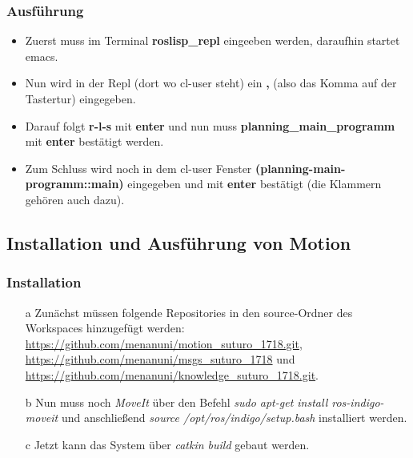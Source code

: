 \documentclass{suturo}
\begin{document}
\subsubsection{Ausführung}
\begin{itemize}

\item Zuerst muss im Terminal \textbf{roslisp\_repl} eingeeben werden, daraufhin startet emacs. 

\item Nun wird in der Repl (dort wo cl-user steht) ein \textbf{,} (also das Komma auf der Tastertur) eingegeben.

\item Darauf folgt \textbf{r-l-s} mit \textbf{enter} und nun muss \textbf{planning\_main\_programm} mit \textbf{enter} bestätigt werden.

\item Zum Schluss wird noch in dem cl-user Fenster \textbf{(planning-main-programm::main)} eingegeben und mit \textbf{enter} bestätigt (die Klammern gehören auch dazu).
\end{itemize}


\subsection{Installation und Ausführung von Motion}

\subsubsection{Installation}
\begin{itemize}


\item[a] Zunächst müssen folgende Repositories in den source-Ordner des Workspaces hinzugefügt werden: \url{https://github.com/menanuni/motion_suturo_1718.git}, \url{https://github.com/menanuni/msgs_suturo_1718} und \url{https://github.com/menanuni/knowledge_suturo_1718.git}.

\item[b] Nun muss noch \textit{MoveIt} über den Befehl \textit{sudo apt-get install ros-indigo-moveit} und anschließend \textit{source /opt/ros/indigo/setup.bash} installiert werden.

\item[c] Jetzt kann das System über \textit{catkin build} gebaut werden.

\end{itemize}
\end{document}
